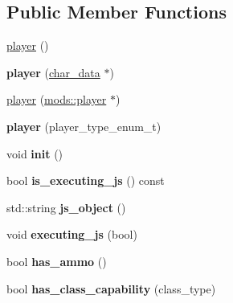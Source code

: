 \subsection*{Public Member Functions}
\begin{DoxyCompactItemize}
\item 
\hyperlink{classmods_1_1player_ae86efeb0a9121b227ac34b24e0556fed}{player} ()
\item 
\mbox{\label{classmods_1_1player_ad8976300005b211fd9c5ccafcf523de6}} 
{\bfseries player} (\hyperlink{structchar__data}{char\+\_\+data} $\ast$)
\item 
\hyperlink{classmods_1_1player_abab6e7c067da6cac1c9e8bd2debbca7a}{player} (\hyperlink{classmods_1_1player}{mods\+::player} $\ast$)
\item 
\mbox{\label{classmods_1_1player_a140e9fa644bed00bada74ce47150fb5d}} 
{\bfseries player} (player\+\_\+type\+\_\+enum\+\_\+t)
\item 
\mbox{\label{classmods_1_1player_ac28bbd514e0f3d935f7c849ff61528c8}} 
void {\bfseries init} ()
\item 
\mbox{\label{classmods_1_1player_aba82c44ce3bf13c934b9d73c0fd08a4a}} 
bool {\bfseries is\+\_\+executing\+\_\+js} () const
\item 
\mbox{\label{classmods_1_1player_a190fc83395bf62dc83b1b90ec052e8d2}} 
std\+::string {\bfseries js\+\_\+object} ()
\item 
\mbox{\label{classmods_1_1player_a392917b4d74e7bbdda390e86dab7fd34}} 
void {\bfseries executing\+\_\+js} (bool)
\item 
\mbox{\label{classmods_1_1player_ae01ca0c7632735009713cc458ebb558b}} 
bool {\bfseries has\+\_\+ammo} ()
\item 
\mbox{\label{classmods_1_1player_ad4fa4d31b79a79f0e5353df1a58e235d}} 
bool {\bfseries has\+\_\+class\+\_\+capability} (class\+\_\+type)
\item 
\mbox{\label{classmods_1_1player_a9685c8a6c64a4ebc5020d7acdc5998ca}} 

\end{DoxyCompactItemize}
